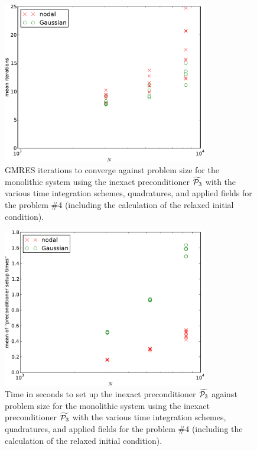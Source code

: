 \begin{figure}
  \centering
  \includegraphics[width=0.8\textwidth]
  {plots/mumag4_monolithic_its/meanofnsolveritersvsinitialnnode.pdf}
  \caption{
    GMRES iterations to converge against problem size for the monolithic system using the inexact preconditioner $\widetilde{\mathcal{P}_3}$ with the various time integration schemes, quadratures, and applied fields for the \mumag problem \#4 (including the calculation of the relaxed initial condition).
}
  \label{fig:mumag4-solver-iterations}
\end{figure}

\begin{figure}
  \centering
  \includegraphics[width=0.8\textwidth]
  {plots/mumag4_monolithic_its/meanofpreconditionersetuptimesvsinitialnnode.pdf}
  \caption{
    Time in seconds to set up the inexact preconditioner $\widetilde{\mathcal{P}_3}$
    against problem size for the monolithic system using the inexact preconditioner $\widetilde{\mathcal{P}_3}$
    with the various time integration schemes, quadratures, and applied fields
    for the \mumag problem \#4 (including the calculation of the relaxed initial condition).
  }
  \label{fig:mumag4-solver-time}
\end{figure}


